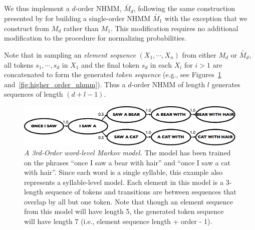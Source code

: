 \documentclass[phd,electronic,oneside,twosidetoc,letterpaper,chaptercenter,parttop,lof,lot]{byumsphd}
\begin{document}
We thus implement a $d$-order NHMM, $\tilde{M_d}$, following the same construction presented by \citeauthor{pachet2011finite} \cite{pachet2011finite} for building a single-order NHMM $\tilde{M_1}$ with the exception that we construct from $M_d$ rather than $M_1$. This modification requires no additional modification to the procedure for normalizing probabilities. 

Note that in sampling an \textit{element sequence} $(X_1,\cdots,X_n)$ from either $M_d$ or $\tilde{M_d}$, all tokens $s_1, \cdots, s_d$ in $X_1$ and the final token $s_d$ in each $X_i$ for $i>1$ are concatenated to form the generated \textit{token sequence} (e.g., see Figures~\ref{fig:higher_order_markov} and~\ref{fig:higher_order_nhmm}). Thus a $d$-order NHMM of length $l$ generates sequences of length $(d+l-1)$.

\begin{figure} 
\centering
\includegraphics[width=\linewidth]{higher_order_mm}
\caption{\textit{A 3rd-Order word-level Markov model.} The model has been trained on the phrases ``once I saw a bear with hair'' and ``once I saw a cat with hair''. Since each word is a single syllable, this example also represents a syllable-level model. Each element in this model is a 3-length sequence of tokens and transitions are between sequences that overlap by all but one token. Note that though an element sequence from this model will have length 5, the generated token sequence will have length 7 (i.e., element sequence length + order - 1).}
\label{fig:higher_order_markov}
\end{figure}
\end{document}
